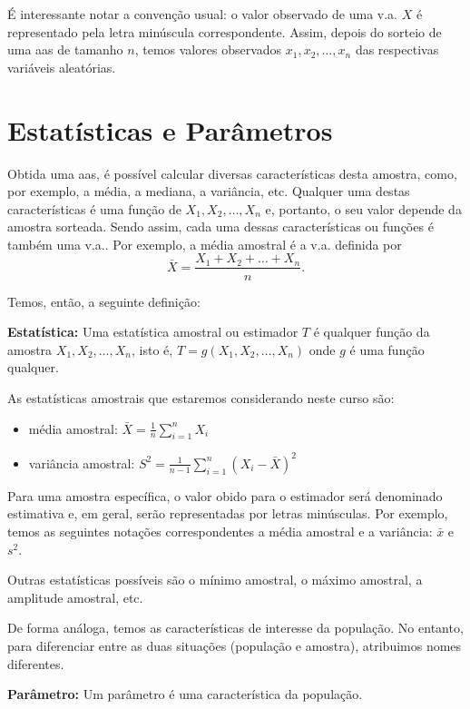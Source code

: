 \documentclass[
]{book}
\providecommand{\tightlist}{%
  \setlength{\itemsep}{0pt}\setlength{\parskip}{0pt}}
\begin{document}
É interessante notar a convenção usual: o valor observado de uma v.a. \(X\) é representado pela letra minúscula correspondente. Assim, depois do sorteio de uma aas de tamanho \(n\), temos valores observados \(x_1, x_2, \ldots, x_n\) das respectivas variáveis aleatórias.

\hypertarget{estatuxedsticas-e-paruxe2metros}{%
\section{Estatísticas e Parâmetros}\label{estatuxedsticas-e-paruxe2metros}}

Obtida uma aas, é possível calcular diversas características desta amostra, como, por exemplo, a média, a mediana, a variância, etc. Qualquer uma destas características é uma função de \(X_1, X_2, \ldots, X_n\) e, portanto, o seu valor depende da amostra sorteada. Sendo assim, cada uma dessas características ou funções é também uma v.a.. Por exemplo, a média amostral é a v.a. definida por \[\bar X = \frac{X_1+X_2+\ldots+X_n}{n}.\]

Temos, então, a seguinte definição:

\textbf{Estatística:} Uma estatística amostral ou estimador \(T\) é qualquer função da amostra \(X_1, X_2, \ldots, X_n\), isto é, \(T = g(X_1, X_2, \ldots, X_n)\) onde \(g\) é uma função qualquer.

As estatísticas amostrais que estaremos considerando neste curso são:

\begin{itemize}
\tightlist
\item
  média amostral: \(\bar X = \frac{1}{n}\sum_{i=1}^n X_i\)
\item
  variância amostral: \(S^2=\frac{1}{n-1}\sum_{i=1}^n (X_i-\bar X)^2\)
\end{itemize}

Para uma amostra específica, o valor obido para o estimador será denominado estimativa e, em geral, serão representadas por letras minúsculas. Por exemplo, temos as seguintes notações correspondentes a média amostral e a variância: \(\bar x\) e \(s^2\).

Outras estatísticas possíveis são o mínimo amostral, o máximo amostral, a amplitude amostral, etc.

De forma análoga, temos as características de interesse da população. No entanto, para diferenciar entre as duas situações (população e amostra), atribuimos nomes diferentes.

\textbf{Parâmetro:} Um parâmetro é uma característica da população.
\end{document}

